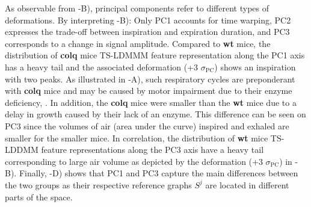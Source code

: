As observable from -B), principal components refer to different types of deformations. 
By interpreting -B): Only PC1 accounts for time warping, PC2 expresses the trade-off between inspiration and expiration duration, and PC3 corresponds to a change in signal amplitude.
 Compared to \textbf{wt} mice, the distribution of \textbf{colq} mice 
TS-LDMMM feature representation along the PC1 axis has a heavy tail and the associated deformation (+3 $\sigma_{\text{PC}}$) 
shows an inspiration with two peaks. As illustrated in -A), such respiratory cycles are preponderant
 with \textbf{colq} mice and may be caused by motor impairment due to their enzyme deficiency, \cite{germain2023unsupervised}.
  In addition, 
 the \textbf{colq} mice were smaller than the \textbf{wt} mice due to a delay in growth caused by their lack of an enzyme. 
 This difference can be seen on PC3 since the volumes of air (area under the curve) inspired and exhaled are
  smaller for the smaller mice. In correlation, the distribution of \textbf{wt} mice TS-LDDMM feature representations 
  along the PC3 axis have a heavy tail corresponding to large air volume as depicted by the deformation 
  (+3 $\sigma_{\text{PC}}$) in -B). Finally, -D) shows that PC1 and PC3 capture the main differences between
   the two groups as their respective reference graphs $S^j$ are located in different parts of the space. 

